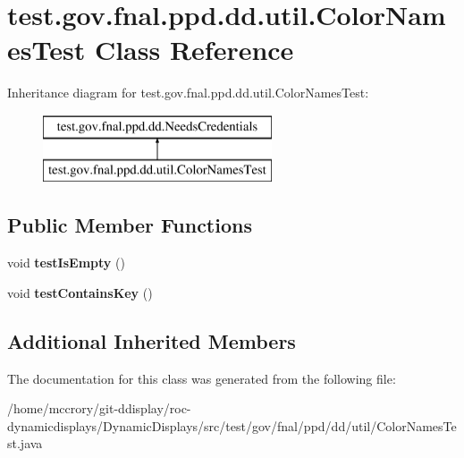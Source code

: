 \hypertarget{classtest_1_1gov_1_1fnal_1_1ppd_1_1dd_1_1util_1_1ColorNamesTest}{\section{test.\-gov.\-fnal.\-ppd.\-dd.\-util.\-Color\-Names\-Test Class Reference}
\label{classtest_1_1gov_1_1fnal_1_1ppd_1_1dd_1_1util_1_1ColorNamesTest}
}
Inheritance diagram for test.\-gov.\-fnal.\-ppd.\-dd.\-util.\-Color\-Names\-Test\-:\begin{figure}[H]
\begin{center}
\leavevmode
\includegraphics[height=2.000000cm]{classtest_1_1gov_1_1fnal_1_1ppd_1_1dd_1_1util_1_1ColorNamesTest}
\end{center}
\end{figure}
\subsection*{Public Member Functions}
\begin{DoxyCompactItemize}
\item 
\hypertarget{classtest_1_1gov_1_1fnal_1_1ppd_1_1dd_1_1util_1_1ColorNamesTest_aa399681fb14a75ae3c15495c64517128}{void {\bfseries test\-Is\-Empty} ()}\label{classtest_1_1gov_1_1fnal_1_1ppd_1_1dd_1_1util_1_1ColorNamesTest_aa399681fb14a75ae3c15495c64517128}

\item 
\hypertarget{classtest_1_1gov_1_1fnal_1_1ppd_1_1dd_1_1util_1_1ColorNamesTest_a07a7f6fc63284f4f6eda2668cbf0e1e7}{void {\bfseries test\-Contains\-Key} ()}\label{classtest_1_1gov_1_1fnal_1_1ppd_1_1dd_1_1util_1_1ColorNamesTest_a07a7f6fc63284f4f6eda2668cbf0e1e7}

\end{DoxyCompactItemize}
\subsection*{Additional Inherited Members}


The documentation for this class was generated from the following file\-:\begin{DoxyCompactItemize}
\item 
/home/mccrory/git-\/ddisplay/roc-\/dynamicdisplays/\-Dynamic\-Displays/src/test/gov/fnal/ppd/dd/util/Color\-Names\-Test.\-java\end{DoxyCompactItemize}
